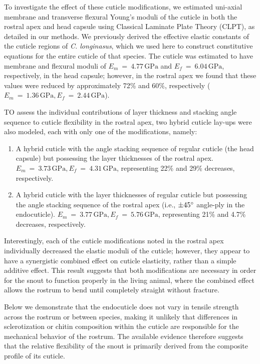 \documentclass[twocolumn, linenumbers, superscriptaddress]{revtex4-1}
\begin{document}
		To investigate the effect of these cuticle modifications, we estimated uni-axial membrane and transverse flexural Young's moduli of the cuticle in both the rostral apex and head capsule using Classical Laminate Plate Theory (CLPT), as detailed in our methods.
		We previously derived the effective elastic constants of the cuticle regions of \textit{C. longinasus}, which we used here to construct constitutive equations for the entire cuticle of that species.
		The cuticle was estimated to have membrane and flexural moduli of $E_m~=~4.77\,\text{GPa}$ and $E_f~=~6.04\,\text{GPa}$, respectively, in the head capsule; however, in the rostral apex we found that these values were reduced by approximately 72\% and 60\%, respectively ($E_m~=~1.36\,\text{GPa}, E_f~=~2.44\,\text{GPa}$).
		
		TO assess the individual contributions of layer thickness and stacking angle sequence to cuticle flexibility in the rostral apex, two hybrid cuticle lay-ups were also modeled, each with only one of the modifications, namely:
		\begin{enumerate}
			\item A hybrid cuticle with the angle stacking sequence of regular cuticle (the head capsule) but possessing the layer thicknesses of the rostral apex. $E_m~=~3.73\,\text{GPa}, E_f~=~4.31\,\text{GPa}$, representing 22\% and 29\% decreases, respectively.
			\item A hybrid cuticle with the layer thicknesses of regular cuticle but possessing the angle stacking sequence of the rostral apex (i.e., $\pm45\degree$ angle-ply in the endocuticle). $E_m~=~3.77\,\text{GPa}, E_f~=~5.76\,\text{GPa}$, representing 21\% and 4.7\% decreases, respectively.
		\end{enumerate}
		
		Interestingly, each of the cuticle modifications noted in the rostral apex  individually decreased the elastic moduli of the cuticle; however, they appear to have a synergistic combined effect on cuticle elasticity, rather than a simple additive effect.
		This result suggests that both modifications are necessary in order for the snout to function properly in the living animal, where the combined effect allows the rostrum to bend until completely straight without fracture.
		
		Below we demonstrate that the endocuticle does not vary in tensile strength across the rostrum or between species, making it unlikely that differences in sclerotization or chitin composition within the cuticle are responsible for the mechanical behavior of the rostrum.
		The available evidence therefore suggests that the relative flexibility of the snout is primarily derived from the composite profile of its cuticle.
		
\end{document}
